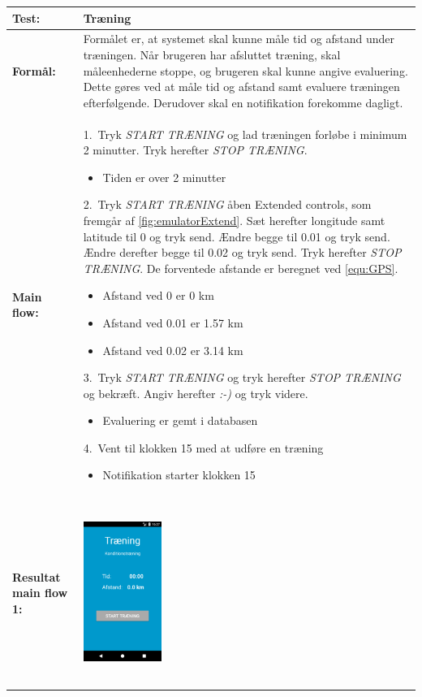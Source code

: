   \begin{longtable}{ | p{2cm} | p{13cm} |} \hline
    \textbf{Test:} & Træning \\ \hline
  \textbf{Formål:} & Formålet er, at systemet skal kunne måle tid og afstand under træningen. Når brugeren har afsluttet træning, skal måleenhederne stoppe, og brugeren skal kunne angive evaluering. Dette gøres ved at måle tid og afstand samt evaluere træningen efterfølgende. Derudover skal en notifikation forekomme dagligt.
 \\ \hline
 	\textbf{Main flow:} & 1.~Tryk \textit{START TRÆNING} og lad træningen forløbe i minimum 2 minutter. Tryk herefter \textit{STOP TRÆNING}.
 	\begin{itemize}
 	\item Tiden er over 2 minutter
 	\end{itemize}	
 	2.~Tryk \textit{START TRÆNING} åben Extended controls, som fremgår af \autoref{fig:emulatorExtend}. Sæt herefter longitude samt latitude til 0 og tryk send. Ændre begge til 0.01 og tryk send. Ændre derefter begge til 0.02 og tryk send. Tryk herefter \textit{STOP TRÆNING}. De forventede afstande er beregnet ved \autoref{equ:GPS}. 
 	\begin{itemize}
 	\item Afstand ved 0 er 0 km
 	\item Afstand ved 0.01 er 1.57 km
 	\item Afstand ved 0.02 er 3.14 km
	\end{itemize}
  3.~Tryk \textit{START TRÆNING} og tryk herefter \textit{STOP TRÆNING} og 	bekræft. Angiv herefter \textit{:-)} og tryk videre.
  \begin{itemize}
  \item Evaluering er gemt i databasen
  \end{itemize}
   4.~Vent til klokken 15 med at udføre en træning
  \begin{itemize}
  \item Notifikation starter klokken 15
  \vspace{1mm}
  \end{itemize}
\\ \hline
\textbf{Resultat main flow 1:} &\hspace{1.5mm}
    \raisebox{-\totalheight}    {\includegraphics[width=0.24\textwidth, height=60mm]{figures/test/traening2}} 

\end{longtable}
